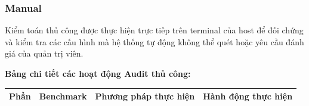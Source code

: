 \subsubsection{Manual}\label{trien-khai-audit-manual}

Kiểm toán thủ công được thực hiện trực tiếp trên terminal của host để đối chứng và kiểm tra các cấu hình mà hệ thống tự động không thể quét hoặc yêu cầu đánh giá của quản trị viên.

\textbf{Bảng chi tiết các hoạt động Audit thủ công:}

{\def\LTcaptype{none}
\begin{center}
\label{tab:chi-tiet-kiem-toan-thu-cong}
\end{center}
\begin{longtable}[]{@{}|
  >{\raggedright\arraybackslash}p{}|
  >{\raggedright\arraybackslash}p{}|
  >{\raggedright\arraybackslash}p{}|
  >{\raggedright\arraybackslash}p{}|@{}}
\hline
\begin{minipage}[b]{\linewidth}\raggedright
\textbf{Phần}
\end{minipage} & \begin{minipage}[b]{\linewidth}\raggedright
\textbf{Benchmark}
\end{minipage} & \begin{minipage}[b]{\linewidth}\raggedright
\textbf{Phương pháp thực hiện}
\end{minipage} & \begin{minipage}[b]{\linewidth}\raggedright
\textbf{Hành động thực hiện}
\end{minipage} \\
\hline
\endhead


\end{longtable}}
